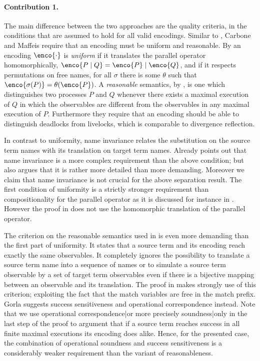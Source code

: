 \documentclass[final,copyright,creativecommons]{eptcs}
\begin{document}
\paragraph{Contribution 1.}
The main difference between the two approaches are the quality criteria, \ie in the conditions that are assumed to hold for all valid encodings.
Similar to \cite{palamidessi03}, Carbone and Maffeis require that an encoding must be uniform and reasonable.
By \cite{carbone} an encoding $\enco{\cdot}$ is \emph{uniform} if it translates the parallel operator homomorphically, \ie $ \enco{P \mid Q} = \enco{P}\mid \enco{Q} $, and if it respects permutations on free names, \ie for all $ \sigma $ there is some $ \theta $ such that $ \enco{\sigma(P)} = \theta(\enco{P}) $.
A \emph{reasonable} semantics, by \cite{carbone}, is one which distinguishes two processes $ P $ and $ Q $ whenever there exists a maximal execution of $ Q $ in which the observables are different from the observables in any maximal execution of $ P $.
Furthermore they require that an encoding should be able to distinguish deadlocks from livelocks, which is comparable to divergence reflection.

In contrast to uniformity, name invariance relates the substitution on the source term names with its translation on target term names. Already \cite{gorla} points out that name invariance is a more complex requirement than the above condition; but \cite{gorla} also argues that it is rather more detailed than more demanding. Moreover we claim that name invariance is not crucial for the above separation result.
The first condition of uniformity is a strictly stronger requirement than compositionality for the parallel operator as it is discussed for instance in \cite{petphd}. However the proof in \cite{carbone} does not use the homomorphic translation of the parallel operator.

The criterion on the reasonable semantics used in \cite{carbone} is even more demanding than the first part of uniformity. It states that a source term and its encoding reach exactly the same observables.
It completely ignores the possibility to translate a source term name into a sequence of names or to simulate a source term observable by a set of target term observables even if there is a bijective mapping between an observable and its translation. The proof in \cite{carbone} makes strongly use of this criterion; exploiting the fact that the match variables are free in the match prefix.
Gorla suggests success sensitiveness and operational correspondence instead. Note that we use operational correspondence|or more precisely soundness|only in the last step of the proof to argument that if a source term reaches success in all finite maximal executions its encoding does alike. Hence, for the presented case, the combination of operational soundness and success sensitiveness is a considerably weaker requirement than the variant of reasonableness.
\end{document}
